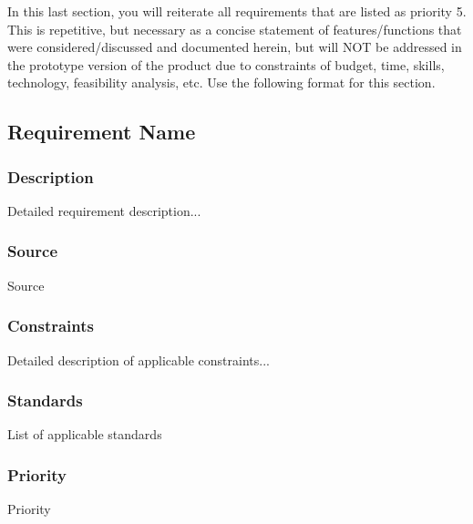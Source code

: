 In this last section, you will reiterate all requirements that are listed as priority 5. This is repetitive, but necessary as a concise statement of features/functions that were considered/discussed and documented herein, but will NOT be addressed in the prototype version of the product due to constraints of budget, time, skills, technology, feasibility analysis, etc. Use the following format for this section.

\subsection{Requirement Name}
\subsubsection{Description}
Detailed requirement description...
\subsubsection{Source}
Source
\subsubsection{Constraints}
Detailed description of applicable constraints...
\subsubsection{Standards}
List of applicable standards
\subsubsection{Priority}
Priority